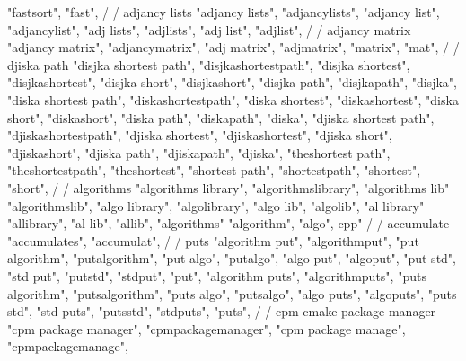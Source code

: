         "fastsort",  
        "fast",  
        /
        / adjancy lists
        "adjancy lists",  
        "adjancylists",  
        "adjancy list",  
        "adjancylist",  
        "adj lists",  
        "adjlists",  
        "adj list",  
        "adjlist",  
        /
        / adjancy matrix 
        "adjancy matrix",  
        "adjancymatrix",  
        "adj matrix",  
        "adjmatrix",  
        "matrix",  
        "mat",  
        /
        / djiska path 
        "disjka shortest path",  
        "disjkashortestpath",  
        "disjka shortest",  
        "disjkashortest",  
        "disjka short",  
        "disjkashort",  
        "disjka path",  
        "disjkapath",  
        "disjka",  
        "diska shortest path",  
        "diskashortestpath",  
        "diska shortest",  
        "diskashortest",  
        "diska short",  
        "diskashort",  
        "diska path",  
        "diskapath",  
        "diska",  
        "djiska shortest path",  
        "djiskashortestpath",  
        "djiska shortest",  
        "djiskashortest",  
        "djiska short",  
        "djiskashort",  
        "djiska path",  
        "djiskapath",  
        "djiska",  
        "theshortest path",  
        "theshortestpath",  
        "theshortest",  
        "shortest path",  
        "shortestpath",  
        "shortest",  
        "short",  
        /
        / algorithms 
        "algorithms library",
        "algorithmslibrary", 
        "algorithms lib"
        "algorithmslib",
        "algo library", 
        "algolibrary",
        "algo lib", 
        "algolib",
        "al library"
        "allibrary",
        "al lib",
        "allib",
        "algorithms"
        "algorithm",
        "algo", cpp"
        /
        / accumulate
        "accumulates",  
        "accumulat",  
        /
        / puts 
        "algorithm put",  
        "algorithmput",  
        "put algorithm",  
        "putalgorithm",  
        "put algo",  
        "putalgo",  
        "algo put",  
        "algoput",  
        "put std",  
        "std put",  
        "putstd",  
        "stdput",  
        "put",  
        "algorithm puts",  
        "algorithmputs",  
        "puts algorithm",  
        "putsalgorithm",  
        "puts algo",  
        "putsalgo",  
        "algo puts",  
        "algoputs",  
        "puts std",  
        "std puts",  
        "putsstd",  
        "stdputs",  
        "puts",  
        /
        / cpm cmake package manager
        "cpm package manager",  
        "cpmpackagemanager",  
        "cpm package manage",  
        "cpmpackagemanage",  
